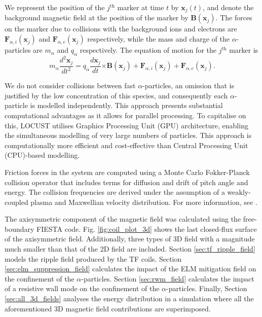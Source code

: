 \documentclass[10pt, a4paper, twoside]{article}
\begin{document}
We represent the position of the $j^{\text{th}}$ marker at time $t$ by $\mathbf{x}_j(t)$, and denote
the background magnetic field at the position of the marker by $\textbf{B}(\mathbf{x}_j)$.
The forces on the marker due to collisions with the background ions and electrons are $\textbf{F}_{\alpha,i}(\mathbf{x}_j)$ and $\textbf{F}_{\alpha,e}(\mathbf{x}_j)$ respectively, while the mass and charge of the $\alpha$-particles are $m_\alpha$ and $q_\alpha$ respectively. The equation of motion for the $j^{\text{th}}$ marker is
\begin{equation}
m_\alpha\frac{d^2\mathbf{x}_j}{dt^2} = q_\alpha\frac{d\mathbf{x}_j}{dt}\mathbf{\times}\textbf{B}(\mathbf{x}_j) + \textbf{F}_{\alpha,i}(\mathbf{x}_j) + \textbf{F}_{\alpha,e}(\mathbf{x}_j).
\end{equation}

We do not consider collisions between fast $\alpha$-particles, an omission that is justified by the low concentration of this species, and consequently each $\alpha$-particle is modelled independently. This approach presents substantial computational advantages as it allows for parallel processing. To capitalise on this, LOCUST utilises Graphics Processing Unit (GPU) architecture, enabling the simultaneous modelling of very large numbers of particles. This approach is computationally more efficient and cost-effective than Central Processing Unit (CPU)-based modelling.

Friction forces in the system are computed using a Monte Carlo Fokker-Planck collision operator that includes terms for diffusion and drift of pitch angle and energy. The collision frequencies are derived under the assumption of a weakly-coupled plasma and Maxwellian velocity distribution. For more information, see \cite{ward2021}.

The axisymmetric component of the magnetic field was calculated using the free-boundary FIESTA code. Fig. \ref{fig:coil_plot_3d} shows the last closed-flux surface of the axisymmetric field. Additionally, three types of 3D field with a magnitude much smaller than that of the 2D field are included. Section \ref{sec:tf_ripple_field} models the ripple field produced by the TF coils. Section \ref{sec:elm_suppression_field} calculates the impact of the ELM mitigation field on the confinement of the $\alpha$-particles. Section \ref{sec:rwm_field} calculates the impact of a resistive wall mode on the confinement of the $\alpha$-particles. Finally, Section \ref{sec:all_3d_fields} analyses the energy distribution in a simulation where all the aforementioned 3D magnetic field contributions are superimposed.
\end{document}
